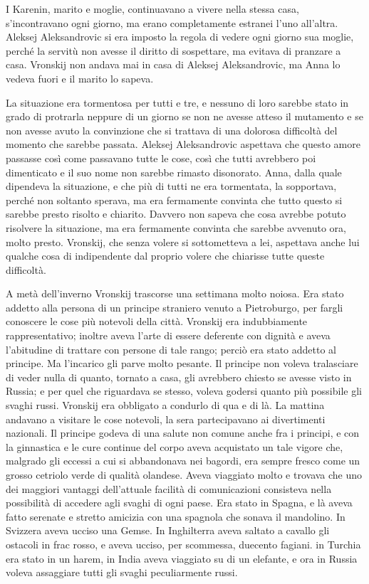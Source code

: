 \label{parte-quarta} 
\pagestyle{pagina}

\label{i-3} 

I Karenin, marito e moglie, continuavano a vivere nella stessa casa, s'incontravano ogni giorno, ma erano completamente estranei l'uno all'altra. Aleksej Aleksandrovic si era imposto la regola di vedere ogni giorno sua moglie, perché la servitù non avesse il diritto di sospettare, ma evitava di pranzare a casa. Vronskij non andava mai in casa di Aleksej Aleksandrovic, ma Anna lo vedeva fuori e il marito lo sapeva. 

La situazione era tormentosa per tutti e tre, e nessuno di loro sarebbe stato in grado di protrarla neppure di un giorno se non ne avesse atteso il mutamento e se non avesse avuto la convinzione che si trattava di una dolorosa difficoltà del momento che sarebbe passata. Aleksej Aleksandrovic aspettava che questo amore passasse così come passavano tutte le cose, così che tutti avrebbero poi dimenticato e il suo nome non sarebbe rimasto disonorato. Anna, dalla quale dipendeva la situazione, e che più di tutti ne era tormentata, la sopportava, perché non soltanto sperava, ma era fermamente convinta che tutto questo si sarebbe presto risolto e chiarito. Davvero non sapeva che cosa avrebbe potuto risolvere la situazione, ma era fermamente convinta che sarebbe avvenuto ora, molto presto. Vronskij, che senza volere si sottometteva a lei, aspettava anche lui qualche cosa di indipendente dal proprio volere che chiarisse tutte queste difficoltà. 

A metà dell'inverno Vronskij trascorse una settimana molto noiosa. Era stato addetto alla persona di un principe straniero venuto a Pietroburgo, per fargli conoscere le cose più notevoli della città. Vronskij era indubbiamente rappresentativo; inoltre aveva l'arte di essere deferente con dignità e aveva l'abitudine di trattare con persone di tale rango; perciò era stato addetto al principe. Ma l'incarico gli parve molto pesante. Il principe non voleva tralasciare di veder nulla di quanto, tornato a casa, gli avrebbero chiesto se avesse visto in Russia; e per quel che riguardava se stesso, voleva godersi quanto più possibile gli svaghi russi. Vronskij era obbligato a condurlo di qua e di là. La mattina andavano a visitare le cose notevoli, la sera partecipavano ai divertimenti nazionali. Il principe godeva di una salute non comune anche fra i principi, e con la ginnastica e le cure continue del corpo aveva acquistato un tale vigore che, malgrado gli eccessi a cui si abbandonava nei bagordi, era sempre fresco come un grosso cetriolo verde di qualità olandese. Aveva viaggiato molto e trovava che uno dei maggiori vantaggi dell'attuale facilità di comunicazioni consisteva nella possibilità di accedere agli svaghi di ogni paese. Era stato in Spagna, e là aveva fatto serenate e stretto amicizia con una spagnola che sonava il mandolino. In Svizzera aveva ucciso una Gemse. In Inghilterra aveva saltato a cavallo gli ostacoli in frac rosso, e aveva ucciso, per scommessa, duecento fagiani. in Turchia era stato in un harem, in India aveva viaggiato su di un elefante, e ora in Russia voleva assaggiare tutti gli svaghi peculiarmente russi. 

